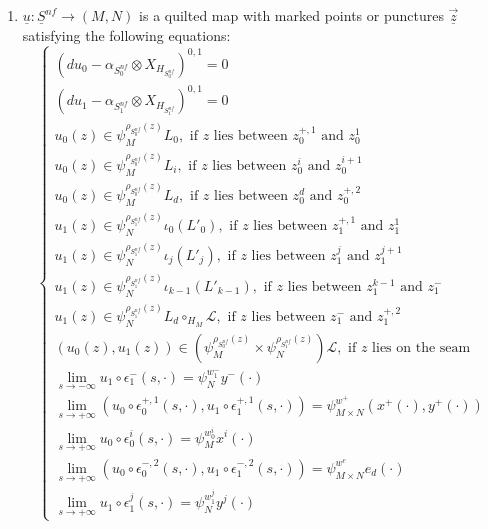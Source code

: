 \documentclass{amsart}
\numberwithin{equation}{section}
\numberwithin{figure}{section}
\begin{document}
\begin{enumerate}[label=(\roman*)]

\item $\underline{u}: \underline{S}^{nf} \to (M, N)$ is a quilted map with marked points or punctures $\underline{\vec{z}}$ satisfying the following equations:
\begin{equation}
\begin{cases}
(du_{0} - \alpha_{S^{nf}_{0}} \otimes X_{H_{S^{nf}_{0}}})^{0, 1} = 0\\
(du_{1} - \alpha_{S^{nf}_{1}} \otimes X_{H_{S^{nf}_{1}}})^{0, 1} = 0\\
u_{0}(z) \in \psi_{M}^{\rho_{S^{nf}_{0}}(z)} L_{0}, \text{ if $z$ lies between $z_{0}^{+,1}$ and $z_{0}^{1}$ }\\
u_{0}(z) \in \psi_{M}^{\rho_{S^{nf}_{0}}(z)} L_{i}, \text{ if $z$ lies between $z_{0}^{i}$ and $z_{0}^{i+1}$ }\\
u_{0}(z) \in \psi_{M}^{\rho_{S^{nf}_{0}}(z)} L_{d}, \text{ if $z$ lies between $z_{0}^{d}$ and $z_{0}^{+, 2}$ }\\
u_{1}(z) \in \psi_{N}^{\rho_{S^{nf}_{1}}(z)} \iota_{0}(L'_{0}), \text{ if $z$ lies between $z_{1}^{+, 1}$ and $z_{1}^{1}$ } \\
u_{1}(z) \in \psi_{N}^{\rho_{S^{nf}_{1}}(z)} \iota_{j}(L'_{j}), \text{ if $z$ lies between $z_{1}^{j}$ and $z_{1}^{j+1}$ }\\
u_{1}(z) \in \psi_{N}^{\rho_{S^{nf}_{1}}(z)} \iota_{k-1}(L'_{k-1}), \text{ if $z$ lies between $z_{1}^{k-1}$ and $z_{1}^{-}$ }\\
u_{1}(z) \in \psi_{N}^{\rho_{S^{nf}_{1}}(z)} L_{d} \circ_{H_{M}} \mathcal{L}, \text{ if $z$ lies between $z_{1}^{-}$ and $z_{1}^{+, 2}$ }\\
(u_{0}(z), u_{1}(z)) \in (\psi_{M}^{\rho_{S^{nf}_{0}}(z)} \times \psi_{N}^{\rho_{S^{nf}_{1}}(z)}) \mathcal{L}, \text{ if $z$ lies on the seam }\\
\lim\limits_{s \to -\infty} u_{1} \circ \epsilon_{1}^{-}(s, \cdot) = \psi_{N}^{w_{1}^{-}} y^{-}(\cdot)\\
\lim\limits_{s \to +\infty} (u_{0} \circ \epsilon_{0}^{+,1}(s, \cdot), u_{1} \circ \epsilon_{1}^{+, 1}(s, \cdot)) = \psi_{M \times N}^{w^{+}}(x^{+}(\cdot), y^{+}(\cdot))\\
\lim\limits_{s \to +\infty} u_{0} \circ \epsilon_{0}^{i}(s, \cdot) = \psi_{M}^{w_{0}^{i}}x^{i}(\cdot)\\
\lim\limits_{s \to +\infty} (u_{0} \circ \epsilon_{0}^{-, 2}(s, \cdot), u_{1} \circ \epsilon_{1}^{-, 2}(s, \cdot)) = \psi_{M \times N}^{w^{e}} e_{d}(\cdot)\\
\lim\limits_{s \to +\infty} u_{1} \circ \epsilon_{1}^{j}(s, \cdot) = \psi_{N}^{w_{1}^{j}}y^{j}(\cdot)
\end{cases}
\end{equation}


\end{enumerate}
\end{document}
